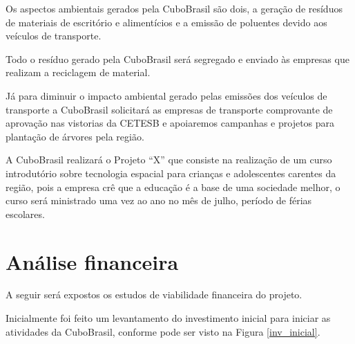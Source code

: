 \documentclass[
	12pt,				%
	openright,			%
	oneside,			%
	a4paper,			%
	english,			%
	french,				%
	spanish,			%
	brazil				%
	]{abntex2}
\begin{document}
	Os aspectos ambientais gerados pela CuboBrasil são dois, a geração de resíduos de materiais de escritório e alimentícios e a emissão de poluentes devido aos veículos de transporte.
	
	Todo o resíduo gerado pela CuboBrasil será segregado e enviado às empresas que realizam a reciclagem de material.
	
	Já para diminuir o impacto ambiental gerado pelas emissões dos veículos de transporte a CuboBrasil solicitará as empresas de transporte comprovante de aprovação nas vistorias da CETESB e apoiaremos campanhas e projetos para plantação de árvores pela região.
	
	A CuboBrasil realizará o Projeto “X” que consiste na realização de um curso introdutório sobre tecnologia espacial para crianças e adolescentes carentes da região, pois a empresa crê que a educação é a base de uma sociedade melhor, o curso será ministrado uma vez ao ano no mês de julho, período de férias escolares.

\chapter{Análise financeira}

	A seguir será expostos os estudos de viabilidade financeira do projeto.
	
	Inicialmente foi feito um levantamento do investimento inicial para iniciar as atividades da CuboBrasil, conforme pode ser visto na Figura \ref{inv_inicial}.
	
\end{document}
